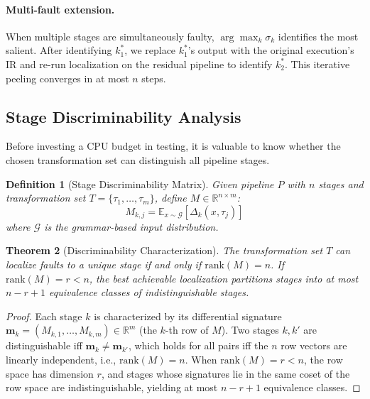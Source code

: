 \documentclass[sigconf,nonacm]{acmart}
\newtheorem{theorem}{Theorem}
\newtheorem{definition}[theorem]{Definition}
\begin{document}
\paragraph{Multi-fault extension.}
When multiple stages are simultaneously faulty, $\arg\max_k \sigma_k$ identifies the most salient.
After identifying $k_1^*$, we replace $k_1^*$'s output with the original execution's IR and re-run localization on the residual pipeline to identify $k_2^*$.
This iterative peeling converges in at most $n$ steps.

\subsection{Stage Discriminability Analysis}\label{sec:discriminability}

Before investing a CPU budget in testing, it is valuable to know whether the chosen transformation set can distinguish all pipeline stages.

\begin{definition}[Stage Discriminability Matrix]
Given pipeline $P$ with $n$ stages and transformation set $T = \{\tau_1, \ldots, \tau_m\}$, define $M \in \mathbb{R}^{n \times m}$:
\begin{equation}\label{eq:discrim}
    M_{k,j} = \mathbb{E}_{x \sim \mathcal{G}}\!\left[\Delta_k(x, \tau_j)\right]
\end{equation}
where $\mathcal{G}$ is the grammar-based input distribution.
\end{definition}

\begin{theorem}[Discriminability Characterization]\label{thm:discriminability}
The transformation set $T$ can localize faults to a unique stage if and only if $\mathrm{rank}(M) = n$.
If $\mathrm{rank}(M) = r < n$, the best achievable localization partitions stages into at most $n - r + 1$ equivalence classes of indistinguishable stages.
\end{theorem}

\begin{proof}
Each stage $k$ is characterized by its differential signature $\mathbf{m}_k = (M_{k,1}, \ldots, M_{k,m}) \in \mathbb{R}^m$ (the $k$-th row of $M$).
Two stages $k, k'$ are distinguishable iff $\mathbf{m}_k \neq \mathbf{m}_{k'}$, which holds for all pairs iff the $n$ row vectors are linearly independent, i.e., $\mathrm{rank}(M) = n$.
When $\mathrm{rank}(M) = r < n$, the row space has dimension $r$, and stages whose signatures lie in the same coset of the row space are indistinguishable, yielding at most $n - r + 1$ equivalence classes.
\end{proof}
\end{document}
